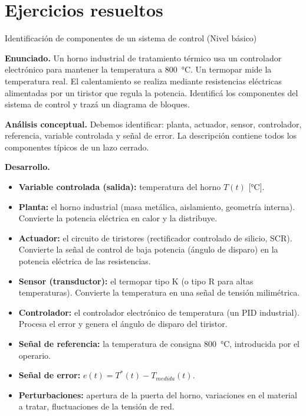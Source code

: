 \section{Ejercicios resueltos}
\label{sec:intro-ejercicios-resueltos}

\begin{ejercicioresuelto}{Identificación de componentes de un sistema de control (Nivel básico)}

\textbf{Enunciado.} Un horno industrial de tratamiento térmico usa un controlador
electrónico para mantener la temperatura a \SI{800}{\celsius}. Un termopar
mide la temperatura real. El calentamiento se realiza mediante resistencias
eléctricas alimentadas por un tiristor que regula la potencia. Identificá
los componentes del sistema de control y trazá un diagrama de bloques.

\textbf{Análisis conceptual.} Debemos identificar: planta, actuador, sensor,
controlador, referencia, variable controlada y señal de error. La descripción
contiene todos los componentes típicos de un lazo cerrado.

\textbf{Desarrollo.}
\begin{itemize}
  \item \textbf{Variable controlada (salida):} temperatura del horno $T(t)$ [\si{\celsius}].
  \item \textbf{Planta:} el horno industrial (masa metálica, aislamiento,
    geometría interna). Convierte la potencia eléctrica en calor y la distribuye.
  \item \textbf{Actuador:} el circuito de tiristores (rectificador controlado
    de silicio, SCR). Convierte la señal de control de baja potencia (ángulo
    de disparo) en la potencia eléctrica de las resistencias.
  \item \textbf{Sensor (transductor):} el termopar tipo K (o tipo R para altas
    temperaturas). Convierte la temperatura en una señal de tensión milimétrica.
  \item \textbf{Controlador:} el controlador electrónico de temperatura (un
    PID industrial). Procesa el error y genera el ángulo de disparo del tiristor.
  \item \textbf{Señal de referencia:} la temperatura de consigna \SI{800}{\celsius},
    introducida por el operario.
  \item \textbf{Señal de error:} $e(t) = T^*(t) - T_{medida}(t)$.
  \item \textbf{Perturbaciones:} apertura de la puerta del horno, variaciones
    en el material a tratar, fluctuaciones de la tensión de red.
\end{itemize}


\end{ejercicioresuelto}
